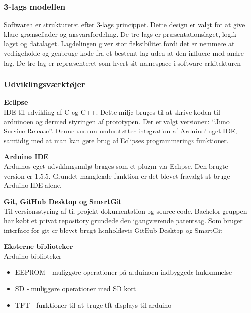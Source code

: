 \subsubsection{3-lags modellen}
Softwaren er struktureret efter 3-lags princippet. Dette design er valgt for at give klare grænseflader og ansvarsfordeling. De tre lags er præsentationslaget, logik laget og datalaget. Lagdelingen giver stor fleksibilitet fordi det er nemmere at vedligeholde og genbruge kode fra et bestemt lag uden at den influere med andre lag. De tre lag er repræsenteret som hvert sit namespace i software arkitekturen

\subsubsection{Udviklingsværktøjer}

\textbf{Eclipse} \\
IDE til udvikling af C og C++. Dette miljø bruges til at skrive koden til arduinoen og dermed styringen af prototypen. Der er valgt versionen: “Juno Service Release”. Denne version understøtter integration af Arduino’ eget IDE, samtidig med at man kan gøre brug af Eclipses programmerings funktioner.  

\textbf{Arduino IDE} \\
Arduinos eget udviklingsmiljø bruges som et plugin via Eclipse. Den brugte version er 1.5.5. Grundet manglende funktion er det blevet fravalgt at bruge Arduino IDE alene. 

\textbf{Git, GitHub Desktop og SmartGit} \\
Til versionsstyring af til projekt dokumentation og source code. Bachelor gruppen har købt et privat repository grundede den igangværende patentsag. Som bruger interface for git er blevet brugt henholdsvis GitHub Desktop og SmartGit

\textbf{Eksterne biblioteker} \\
Arduino biblioteker 
\begin{itemize}
\item EEPROM - muliggøre operationer på arduinoen indbyggede hukommelse
\item SD - muliggøre operationer med SD kort
\item TFT - funktioner til at bruge tft displays til arduino 
\end{itemize}

